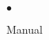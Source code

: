 \documentclass[epsf]{article}
\begin{document}

\begin{list}{$ \bullet$}
\item Manual 
\end{list}
\end{document}
